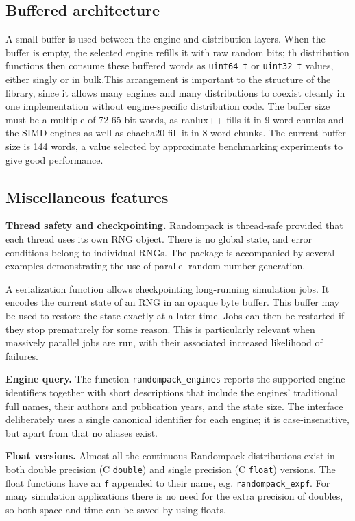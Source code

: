 \documentclass[manuscript,screen,review]{acmart}
\begin{document}
\subsection{Buffered architecture}
A small buffer is used between the engine and distribution layers.
When the buffer is empty, the selected engine refills it with raw
random bits; th distribution functions then consume these buffered
words as \texttt{uint64\_t} or \texttt{uint32\_t} values, either singly
or in bulk.This arrangement is important to the structure of the
library, since it allows many engines and many distributions to
coexist cleanly in one implementation without engine-specific
distribution code. The buffer size must be a multiple of 72 65-bit
words, as ranlux++ fills it in 9 word chunks and the SIMD-engines as
well as chacha20 fill it in 8 word chunks. The current buffer size is
144 words, a value selected by approximate benchmarking experiments to
give good performance.

\subsection{Miscellaneous features}
\textbf{Thread safety and checkpointing.} Randompack is thread-safe
provided that each thread uses its own RNG object. There is no global
state, and error conditions belong to individual RNGs. The package is
accompanied by several examples demonstrating the use of parallel
random number generation. 

A serialization function allows checkpointing long-running simulation
jobs. It encodes the current state of an RNG in an opaque byte buffer.
This buffer may be used to restore the state exactly at a later time.
Jobs can then be restarted if they stop prematurely for some
reason. This is particularly relevant when massively parallel jobs are
run, with their associated increased likelihood of failures.

\textbf{Engine query.} The function \texttt{randompack\_engines}
reports the supported engine identifiers together with short
descriptions that include the engines' traditional full names, their
authors and publication years, and the state size. The interface
deliberately uses a single canonical identifier for each engine; it is
case-insensitive, but apart from that no aliases exist.

\textbf{Float versions.} Almost all the continuous Randompack
distributions exist in both double precision (C \texttt{double}) and
single precision (C \texttt{float}) versions. The float functions have
an \texttt{f} appended to their name, e.g. \texttt{randompack\_expf}.
For many simulation applications there is no need for the extra
precision of doubles, so both space and time can be saved by using
floats.
\end{document}
